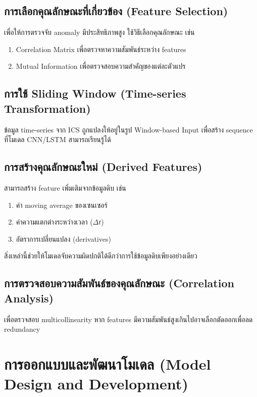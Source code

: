 \subsection{การเลือกคุณลักษณะที่เกี่ยวข้อง (Feature Selection)}
\hspace{2em} เพื่อให้การตรวจจับ anomaly มีประสิทธิภาพสูง ใช้วิธีเลือกคุณลักษณะ เช่น
\begin{enumerate}
  \item Correlation Matrix เพื่อตรวจหาความสัมพันธ์ระหว่าง features
  \item Mutual Information เพื่อตรวจสอบความสำคัญของแต่ละตัวแปร
\end{enumerate}

\subsection{การใช้ Sliding Window (Time-series Transformation)}
\hspace{2em} ข้อมูล time-series จาก ICS ถูกแปลงให้อยู่ในรูป Window-based Input เพื่อสร้าง sequence ที่โมเดล CNN/LSTM สามารถเรียนรู้ได้

\subsection{การสร้างคุณลักษณะใหม่ (Derived Features)}
\hspace{2em} สามารถสร้าง feature เพิ่มเติมจากข้อมูลดิบ เช่น
\begin{enumerate}
  \item ค่า moving average ของเซนเซอร์
  \item ค่าความแตกต่างระหว่างเวลา ($\Delta t$)
  \item อัตราการเปลี่ยนแปลง (derivatives)
\end{enumerate}
สิ่งเหล่านี้ช่วยให้โมเดลจับความผิดปกติได้ดีกว่าการใช้ข้อมูลดิบเพียงอย่างเดียว

\subsection{การตรวจสอบความสัมพันธ์ของคุณลักษณะ (Correlation Analysis)}
\hspace{2em} เพื่อตรวจสอบ multicollinearity หาก features มีความสัมพันธ์สูงเกินไปอาจเลือกตัดออกเพื่อลด redundancy

\section{การออกแบบและพัฒนาโมเดล (Model Design and Development)}

